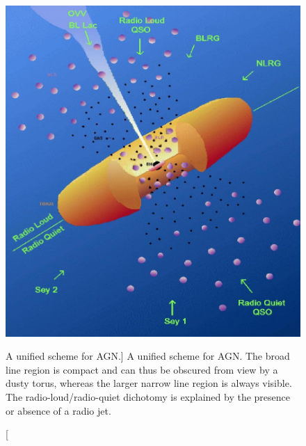 \begin{figure}
\centering
\includegraphics[width=1.0\textwidth]{figures/01-intro/up95.png}
\caption
[A unified scheme for AGN.]
{
A unified scheme for AGN. The broad line region is compact and can thus
be obscured from view by a dusty torus, whereas the larger narrow line region
is always visible. The radio-loud/radio-quiet dichotomy is explained by
the presence or absence of a radio jet.
} 
\label{fig:unification}
\end{figure} 

